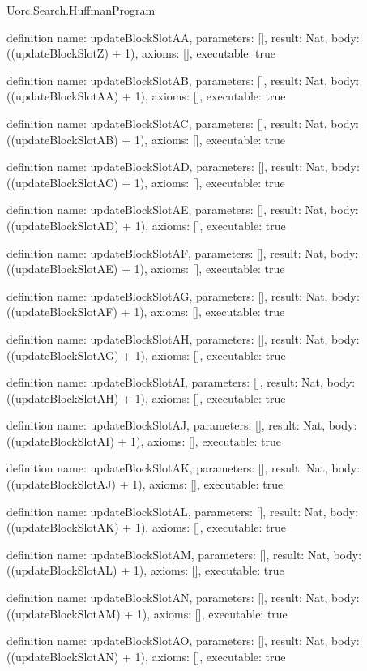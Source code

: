 \begin{lexlean}{Uorc.Search.HuffmanProgram}
\begin{semanticmodule}
definition{
  name: updateBlockSlotAA,
  parameters: [],
  result: Nat,
  body: ((updateBlockSlotZ) + 1),
  axioms: [],
  executable: true
}

definition{
  name: updateBlockSlotAB,
  parameters: [],
  result: Nat,
  body: ((updateBlockSlotAA) + 1),
  axioms: [],
  executable: true
}

definition{
  name: updateBlockSlotAC,
  parameters: [],
  result: Nat,
  body: ((updateBlockSlotAB) + 1),
  axioms: [],
  executable: true
}

definition{
  name: updateBlockSlotAD,
  parameters: [],
  result: Nat,
  body: ((updateBlockSlotAC) + 1),
  axioms: [],
  executable: true
}

definition{
  name: updateBlockSlotAE,
  parameters: [],
  result: Nat,
  body: ((updateBlockSlotAD) + 1),
  axioms: [],
  executable: true
}

definition{
  name: updateBlockSlotAF,
  parameters: [],
  result: Nat,
  body: ((updateBlockSlotAE) + 1),
  axioms: [],
  executable: true
}

definition{
  name: updateBlockSlotAG,
  parameters: [],
  result: Nat,
  body: ((updateBlockSlotAF) + 1),
  axioms: [],
  executable: true
}

definition{
  name: updateBlockSlotAH,
  parameters: [],
  result: Nat,
  body: ((updateBlockSlotAG) + 1),
  axioms: [],
  executable: true
}

definition{
  name: updateBlockSlotAI,
  parameters: [],
  result: Nat,
  body: ((updateBlockSlotAH) + 1),
  axioms: [],
  executable: true
}

definition{
  name: updateBlockSlotAJ,
  parameters: [],
  result: Nat,
  body: ((updateBlockSlotAI) + 1),
  axioms: [],
  executable: true
}

definition{
  name: updateBlockSlotAK,
  parameters: [],
  result: Nat,
  body: ((updateBlockSlotAJ) + 1),
  axioms: [],
  executable: true
}

definition{
  name: updateBlockSlotAL,
  parameters: [],
  result: Nat,
  body: ((updateBlockSlotAK) + 1),
  axioms: [],
  executable: true
}

definition{
  name: updateBlockSlotAM,
  parameters: [],
  result: Nat,
  body: ((updateBlockSlotAL) + 1),
  axioms: [],
  executable: true
}

definition{
  name: updateBlockSlotAN,
  parameters: [],
  result: Nat,
  body: ((updateBlockSlotAM) + 1),
  axioms: [],
  executable: true
}

definition{
  name: updateBlockSlotAO,
  parameters: [],
  result: Nat,
  body: ((updateBlockSlotAN) + 1),
  axioms: [],
  executable: true
}


\end{semanticmodule}
\end{lexlean}
